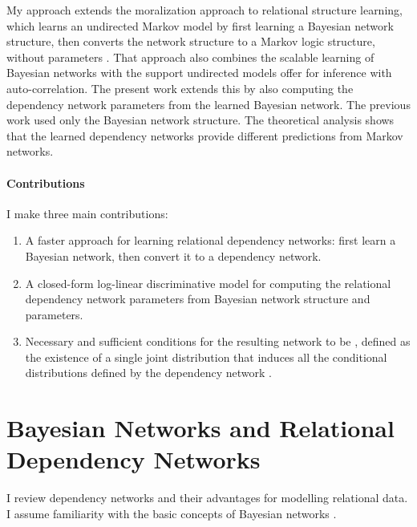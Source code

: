 \documentclass{sfuthesis}
\begin{document}
My approach extends the moralization approach to relational structure learning, which learns an undirected Markov model by first learning a Bayesian network structure, then converts the network structure to a Markov logic structure, without parameters \cite{Khosravi2010,Schulte2012}. That approach also combines the scalable learning of Bayesian networks with the support undirected models offer for inference with auto-correlation. 
The present work extends this by also computing the dependency network parameters from the learned Bayesian network. The previous work used only the Bayesian network structure. The theoretical analysis shows that the learned dependency networks provide different predictions from Markov networks. 

\paragraph{Contributions}

I  make three main contributions:
\begin{enumerate}
\item A faster approach for learning relational dependency networks: first learn a Bayesian network, then convert it to a dependency network.
\item A closed-form log-linear discriminative model for computing the relational dependency network parameters from Bayesian network structure and parameters.
\item Necessary and sufficient conditions for the resulting network to be , defined as the existence of a single joint distribution that induces all the conditional distributions defined by the dependency network \cite{Heckerman2000}.
\end{enumerate}




\section{Bayesian Networks and Relational Dependency Networks} 
I  review dependency networks and their advantages for modelling relational data. I assume familiarity with the basic concepts of Bayesian networks \cite{Pearl1988}. 
 
\end{document}
